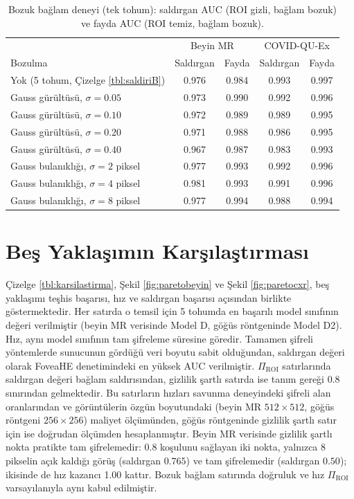 \begin{table}[h!]
{\setlength{\tabcolsep}{6pt}
\caption{Bozuk bağlam deneyi (tek tohum): saldırgan AUC (ROI gizli, bağlam bozuk) ve fayda AUC (ROI temiz, bağlam bozuk).}
\begin{center}
\vspace{-6mm}
\begin{tabular}{lcccc}
\hline\hline
& \multicolumn{2}{c}{Beyin MR} & \multicolumn{2}{c}{COVID-QU-Ex} \\
Bozulma & Saldırgan & Fayda & Saldırgan & Fayda \\
\hline
Yok (5 tohum, Çizelge \ref{tbl:saldiriB}) & 0.976 & 0.984 & 0.993 & 0.997 \\
Gauss gürültüsü, $\sigma = 0.05$ & 0.973 & 0.990 & 0.992 & 0.996 \\
Gauss gürültüsü, $\sigma = 0.10$ & 0.972 & 0.989 & 0.989 & 0.995 \\
Gauss gürültüsü, $\sigma = 0.20$ & 0.971 & 0.988 & 0.986 & 0.995 \\
Gauss gürültüsü, $\sigma = 0.40$ & 0.967 & 0.987 & 0.983 & 0.993 \\
Gauss bulanıklığı, $\sigma = 2$ piksel & 0.977 & 0.993 & 0.992 & 0.996 \\
Gauss bulanıklığı, $\sigma = 4$ piksel & 0.981 & 0.993 & 0.991 & 0.996 \\
Gauss bulanıklığı, $\sigma = 8$ piksel & 0.977 & 0.994 & 0.988 & 0.994 \\
\hline
\end{tabular}
\vspace{-6mm}
\end{center}
\label{tbl:gurultu}}
\end{table}

\section{Beş Yaklaşımın Karşılaştırması}\label{sec:res:compare}

Çizelge \ref{tbl:karsilastirma}, Şekil \ref{fig:paretobeyin} ve Şekil \ref{fig:paretocxr}, beş yaklaşımı teşhis başarısı, hız ve saldırgan başarısı açısından birlikte göstermektedir. Her satırda o temsil için 5 tohumda en başarılı model sınıfının değeri verilmiştir (beyin MR verisinde Model D, göğüs röntgeninde Model D2). Hız, aynı model sınıfının tam şifreleme süresine göredir. Tamamen şifreli yöntemlerde sunucunun gördüğü veri boyutu sabit olduğundan, saldırgan değeri olarak FoveaHE denetimindeki en yüksek AUC verilmiştir. $\Pi_{\mathrm{ROI}}$ satırlarında saldırgan değeri bağlam saldırısından, gizlilik şartlı satırda ise tanım gereği $0.8$ sınırından gelmektedir. Bu satırların hızları savunma deneyindeki şifreli alan oranlarından ve görüntülerin özgün boyutundaki (beyin MR $512 \times 512$, göğüs röntgeni $256 \times 256$) maliyet ölçümünden, göğüs röntgeninde gizlilik şartlı satır için ise doğrudan ölçümden hesaplanmıştır. Beyin MR verisinde gizlilik şartlı nokta pratikte tam şifrelemedir: $0.8$ koşulunu sağlayan iki nokta, yalnızca 8 pikselin açık kaldığı görüş (saldırgan $0.765$) ve tam şifrelemedir (saldırgan $0.50$); ikisinde de hız kazancı 1.00 kattır. Bozuk bağlam satırında doğruluk ve hız $\Pi_{\mathrm{ROI}}$ varsayılanıyla aynı kabul edilmiştir.

